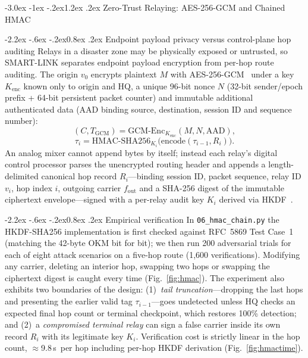 \documentclass[10pt,a4paper]{article}
\makeatletter
\renewcommand\section{\@startsection{section}{1}{\z@}%
  {-3.0ex \@plus -1ex \@minus -.2ex}{1.2ex \@plus .2ex}%
  {\normalfont\large\bfseries}}
\renewcommand\subsection{\@startsection{subsection}{2}{\z@}%
  {-2.2ex \@plus -.6ex \@minus -.2ex}{0.8ex \@plus .2ex}%
  {\normalfont\normalsize\bfseries}}
\newcommand\us{\,\textmu s}
\makeatother
\begin{document}
\section{Zero-Trust Relaying: AES-256-GCM and Chained HMAC}\label{sec:security}

\subsection{Endpoint payload privacy versus control-plane hop auditing}
Relays in a disaster zone may be physically exposed or untrusted, so SMART-LINK separates endpoint payload encryption from
per-hop route auditing. The origin $v_0$ encrypts plaintext $M$ with AES-256-GCM~\cite{gcm} under a key $K_\text{enc}$ known
only to origin and HQ, a unique 96-bit nonce $N$ (32-bit sender/epoch prefix + 64-bit persistent packet counter) and
immutable additional authenticated data (AAD binding source, destination, session ID and sequence number):
\begin{equation}\label{eq:gcm}
  (C,T_\text{GCM})=\text{GCM-Enc}_{K_\text{enc}}(M,N,\text{AAD}),
\end{equation}
\begin{equation}\label{eq:hmac}
  \tau_i=\text{HMAC-SHA256}_{K_i}\bigl(\mathrm{encode}(\tau_{i-1},R_i)\bigr).
\end{equation}
An analog mixer cannot append bytes by itself; instead each relay's digital control processor parses the unencrypted
routing header and appends a length-delimited canonical hop record $R_i$---binding session ID, packet sequence, relay ID
$v_i$, hop index $i$, outgoing carrier $f_\text{out}$ and a SHA-256 digest of the immutable ciphertext envelope---signed with
a per-relay audit key $K_i$ derived via HKDF~\cite{hmac,hkdf}.

\subsection{Empirical verification}
In \texttt{06\_hmac\_chain.py} the HKDF-SHA256 implementation is first checked against RFC~5869 Test Case~1 (matching the
42-byte OKM bit for bit); we then run 200 adversarial trials for each of eight attack scenarios on a five-hop route
(1{,}600 verifications). Modifying any carrier, deleting an interior hop, swapping two hops or swapping the ciphertext digest
is caught every time (Fig.~\ref{fig:hmac}). The experiment also exhibits two boundaries of the design: (1)~\emph{tail
truncation}---dropping the last hops and presenting the earlier valid tag $\tau_{i-1}$---goes undetected unless HQ checks an
expected final hop count or terminal checkpoint, which restores 100\% detection; and (2)~a \emph{compromised terminal relay}
can sign a false carrier inside its own record $R_i$ with its legitimate key $K_i$. Verification cost is strictly linear in
the hop count, $\approx$9.8\us\ per hop including per-hop HKDF derivation (Fig.~\ref{fig:hmactime}).
\end{document}
